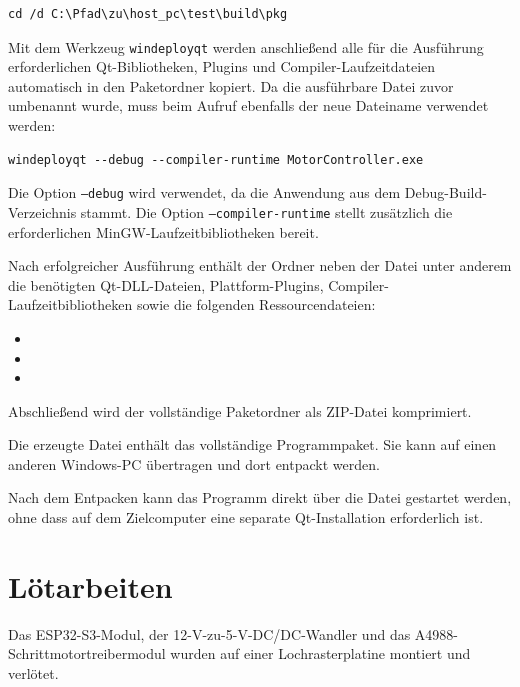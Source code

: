 \documentclass[a4paper,12pt]{article}
\begin{document}
\begin{lstlisting}[caption={Wechsel des Laufwerks und Verzeichnisses}]
cd /d C:\Pfad\zu\host_pc\test\build\pkg
\end{lstlisting}

Mit dem Werkzeug \texttt{windeployqt} werden anschließend alle für die
Ausführung erforderlichen Qt-Bibliotheken, Plugins und
Compiler-Laufzeitdateien automatisch in den Paketordner kopiert. Da die
ausführbare Datei zuvor umbenannt wurde, muss beim Aufruf ebenfalls der
neue Dateiname verwendet werden:

\begin{lstlisting}[caption={Bereitstellung der Qt-Laufzeitbibliotheken}]
windeployqt --debug --compiler-runtime MotorController.exe
\end{lstlisting}

Die Option \texttt{--debug} wird verwendet, da die Anwendung aus dem
Debug-Build-Verzeichnis stammt. Die Option \texttt{--compiler-runtime}
stellt zusätzlich die erforderlichen MinGW-Laufzeitbibliotheken bereit.

Nach erfolgreicher Ausführung enthält der Ordner  neben der
Datei  unter anderem die benötigten
Qt-DLL-Dateien, Plattform-Plugins, Compiler-Laufzeitbibliotheken sowie
die folgenden Ressourcendateien:

\begin{itemize}
    \item {}
    \item {}
    \item {}
\end{itemize}

Abschließend wird der vollständige Paketordner als ZIP-Datei komprimiert.


Die erzeugte Datei  enthält das
vollständige Programmpaket. Sie kann auf einen anderen Windows-PC
übertragen und dort entpackt werden.

Nach dem Entpacken kann das Programm direkt über die Datei
 gestartet werden, ohne dass auf dem
Zielcomputer eine separate Qt-Installation erforderlich ist.


\newpage

\section{Lötarbeiten}

Das ESP32-S3-Modul, der 12-V-zu-5-V-DC/DC-Wandler und das
A4988-Schrittmotortreibermodul wurden auf einer Lochrasterplatine
montiert und verlötet.
\end{document}
